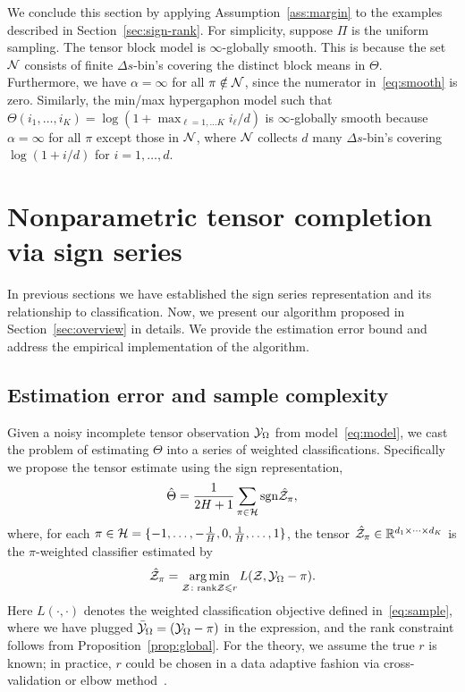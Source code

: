 \documentclass[useAMS,usenatbib,usegraphicx,referee]{biom}
\theoremstyle{plain}
\theoremstyle{definition}
\def\sign{\textup{sgn}}
\begin{document}
We conclude this section by applying Assumption~\ref{ass:margin} to the examples described in Section~\ref{sec:sign-rank}. For simplicity, suppose $\Pi$ is the uniform sampling. 
The tensor block model is $\infty$-globally smooth. This is because the set $\mathcal{N}$ consists of finite $\Delta s$-bin's covering the distinct block means in $\Theta$. Furthermore, we have $\alpha= \infty$ for all $\pi \notin \mathcal{N}$, since the numerator in~\eqref{eq:smooth} is zero.  Similarly, the min/max hypergaphon model such that  $\Theta(i_1,\ldots,i_K) = \log(1+\max_{\ell = 1,\ldots K}i_\ell/d)$ is $\infty$-globally smooth because $\alpha=\infty$ for all $\pi$ except those in $\mathcal{N}$, where $\mathcal{N}$ collects $d$ many $\Delta s$-bin's covering $\log(1+i/d)$ for $i =1,\ldots, d$.


\vspace{-.5cm}

\section{Nonparametric tensor completion via sign series}\label{sec:estimation}
In previous sections we have established the sign series representation and its relationship to classification. Now, we present our algorithm proposed in Section~\ref{sec:overview} in details. We provide the estimation error bound and address the empirical implementation of the algorithm. 
\vspace{-.3cm}

\subsection{Estimation error and sample complexity}

Given a noisy incomplete tensor observation $\mathcal{Y}_\Omega$ from model~\eqref{eq:model}, we cast the problem of estimating $\Theta$ into a series of weighted classifications. Specifically we propose the tensor estimate using the sign representation,
\begin{equation}\label{eq:est}
\hat \Theta = {1\over 2H+1}\sum_{\pi \in \tH}\sign{\hat \tZ_\pi},
\end{equation}
where, for each $\pi \in \mathcal{H}=\{-1,\ldots,-{1\over H}, 0, {1\over H},\ldots,1\}$, the tensor $\hat {\mathcal{Z}}_\pi\in\mathbb{R}^{d_1\times \dots\times d_K}$ is the $\pi$-weighted classifier estimated by
\begin{equation}\label{eq:estimate}
\hat \tZ_\pi = \argmin_{\tZ\colon \text{rank}\tZ\leq r} L(\tZ, \tY_\Omega-\pi).
\end{equation}
Here $L(\cdot,\cdot)$ denotes the weighted classification objective defined in~\eqref{eq:sample}, where we have plugged $\bar {\mathcal{Y}}_\Omega=(\mathcal{Y}_\Omega-\pi)$ in the expression, and the rank constraint follows from Proposition~\ref{prop:global}. For the theory, we assume the true $r$ is known; in practice, $r$ could be chosen in a data adaptive fashion via cross-validation or elbow method~\citep{hastie2009elements}. 
\end{document}
